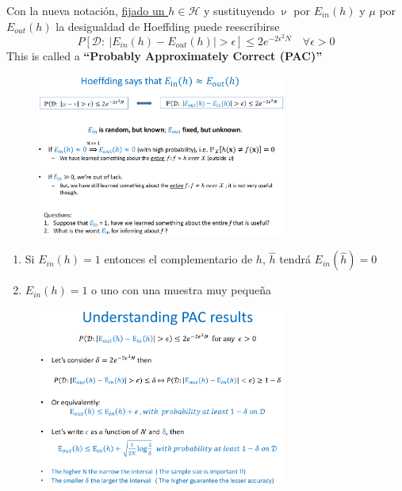 \documentclass[11pt,a4paper]{article}
\theoremstyle{definition}
\begin{document}
	Con la nueva notación, \underline{fijado un $h\in \mathcal{H}$} y sustituyendo $\upnu$ por $E_{in}(h)$ y  $\mu$ por $E_{out}(h)$ la desigualdad de Hoeffding puede reescribirse
	$$P[\mathcal{D}:\ |E_{in}(h)-E_{out}(h)|>\epsilon]\leq 2e^{-2\epsilon ^2N} \quad \forall \epsilon >0$$
	This is called a \textbf{``Probably Approximately Correct (PAC)''}
	
	\begin{figure}[H]
		\centering
		\includegraphics[width=0.73\textwidth]{images/hoeffding_says}
	\end{figure}
	
	\begin{enumerate}
		\item Si $E_{in}(h)=1$ entonces el complementario de $h$, $\hat h$ tendrá $E_{in}(\hat h)=0$
		\item $E_{in}(h)=1$ o uno con una muestra muy pequeña
	\end{enumerate}
	
	
	\begin{figure}[H]
		\centering
		\includegraphics[width=0.73\textwidth]{images/understanding_pac_results}
	\end{figure}
\end{document}
